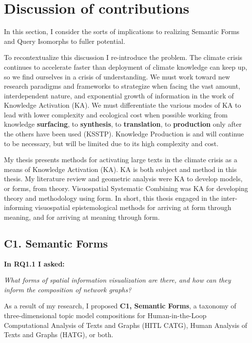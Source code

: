\chapter{Discussion of contributions}
In this section, I consider the sorts of implications to realizing Semantic Forms and Query Isomorphs to fuller potential.

To recontextualize this discussion I re-introduce the problem. The climate crisis continues to accelerate faster than deployment of climate knowledge can keep up, so we find ourselves in a crisis of understanding. We must work toward new research paradigms and frameworks to strategize when facing the vast amount, interdependent nature, and exponential growth of information in the work of Knowledge Activation (KA). We must differentiate the various modes of KA to lead with lower complexity and ecological cost when possible working from knowledge \textbf{surfacing}, to \textbf{synthesis}, to \textbf{translation}, to \textbf{production} only after the others have been used (KSSTP). Knowledge Production is and will continue to be necessary, but will be limited due to its high complexity and cost. 

My thesis presents methods for activating large texts in the climate crisis as a means of Knowledge Activation (KA). KA is both subject and method in this thesis. My literature review and geometric analysis were KA to develop models, or forms, from theory. Visuospatial Systematic Combining was KA for developing theory and methodology using form. In short, this thesis engaged in the inter-informing visuospatial epistemological methods for arriving at form through meaning, and for arriving at meaning through form. 

\section{C1. Semantic Forms}


\noindent\textbf{In RQ1.1 I asked:}

\textit{What forms of spatial information visualization are there, and how can they inform the composition of network graphs?}

As a result of my research, I proposed \textbf{C1, Semantic Forms}, a taxonomy of three-dimensional topic model compositions for Human-in-the-Loop Computational Analysis of Texts and Graphs (HITL CATG), Human Analysis of Texts and Graphs (HATG), or both.

\vspace{1em}

